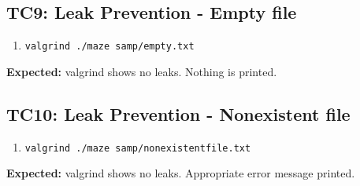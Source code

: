 \documentclass[11pt]{report}
\begin{document}
\subsection*{TC9: Leak Prevention - Empty file}
\begin{enumerate}
  \item {\texttt{\color{red}valgrind ./maze samp/empty.txt}}
\end{enumerate}
\textbf{Expected:} valgrind shows no leaks. Nothing is printed.
\subsection*{TC10: Leak Prevention - Nonexistent file}
\begin{enumerate}
  \item {\texttt{\color{red}valgrind ./maze samp/nonexistentfile.txt}}
\end{enumerate}
\textbf{Expected:} valgrind shows no leaks. Appropriate error message printed.
\end{document}
